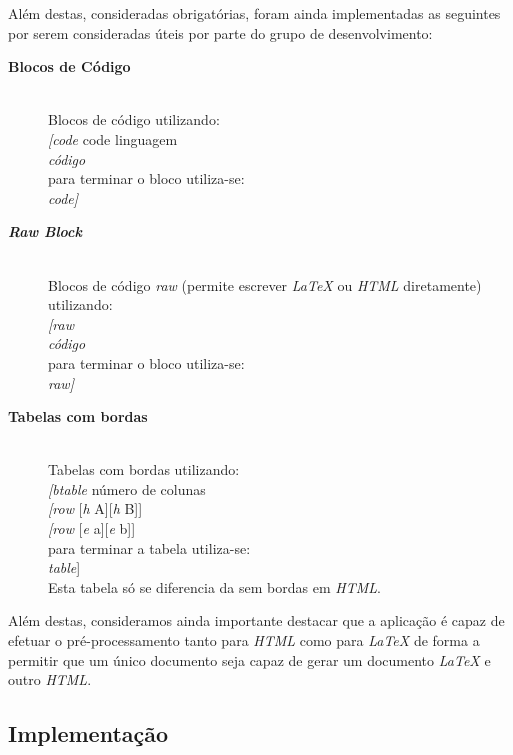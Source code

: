 \documentclass{article}
\begin{document}
 Além destas, consideradas obrigatórias, foram ainda implementadas as seguintes por serem consideradas úteis por parte do grupo de desenvolvimento:
\begin{description}
\item[\textbf{Blocos de Código}]\\
Blocos de código utilizando:\\
\textit{[code} code linguagem\\
\textit{código}\\
para terminar o bloco utiliza-se:\\
\textit{code]}
\item[\textbf{\textit{Raw Block}}]\\
Blocos de código \textit{raw} (permite escrever \textit{LaTeX} ou \textit{HTML} diretamente) utilizando:\\
\textit{[raw}\\
\textit{código}\\
para terminar o bloco utiliza-se:\\
\textit{raw]}
\item[\textbf{Tabelas com bordas}]\\
Tabelas com bordas utilizando:\\
\textit{[btable} número de colunas\\
\textit{[row} [\textit{h} A][\textit{h} B]]\\
\textit{[row} [\textit{e} a][\textit{e} b]]\\
para terminar a tabela utiliza-se:\\
\textit{table}]\\
Esta tabela só se diferencia da sem bordas em \textit{HTML}.
\end{description}
 Além destas, consideramos ainda importante destacar que a aplicação é capaz de efetuar o pré-processamento tanto para \textit{HTML} como para \textit{LaTeX} de forma a permitir que um único documento seja capaz de gerar um documento \textit{LaTeX} e outro \textit{HTML}.\\
 \subsection{Implementação}
\end{document}
